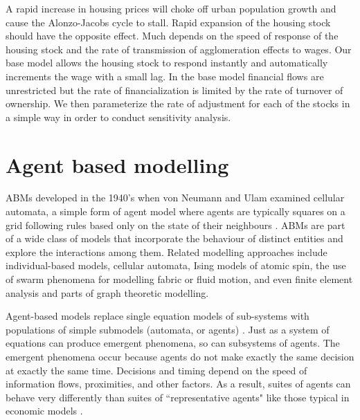 A rapid increase in housing prices will choke off urban population growth and cause the Alonzo-Jacobs cycle to stall. Rapid expansion of the housing stock should have the opposite effect. Much depends on the speed of response of the housing stock and the rate of transmission of agglomeration effects to wages. Our base model allows the housing stock to respond instantly and automatically increments the wage with a small lag. In the base model financial flows are unrestricted but the rate of financialization is limited by the rate of turnover of ownership. We then parameterize the rate of adjustment for each of the stocks in a simple way in order to conduct sensitivity analysis.


\section{Agent based modelling}

ABMs developed in the 1940's when von Neumann and Ulam examined cellular automata, a simple form of agent model where agents are typically squares on a grid following rules based only on the state of their neighbours \cite{banks_statistical_2009}. ABMs %
are part of a wide class of models that incorporate the behaviour of  distinct entities and explore the interactions among them. Related modelling approaches include individual-based models, cellular automata, Ising models of atomic spin, the use of swarm phenomena for modelling fabric or fluid motion, and even finite element analysis and parts of graph theoretic modelling. %

Agent-based models replace single equation models of sub-systems with populations of simple submodels (automata, or agents) \cite{shalizi_methods_2006}. Just as a system of equations can produce emergent phenomena, so can subsystems of agents. The emergent phenomena occur because agents do not make exactly the same decision at exactly the same time. Decisions and timing depend on the speed of information flows, proximities, and other factors. As a result, suites of agents can behave very differently than suites of  ``representative agents" like those typical in economic models \cite{darley_towards_1999, tesfatsion_agent-based_2002}.


